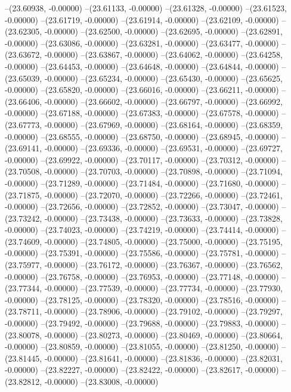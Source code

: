 --(23.60938, -0.00000)
--(23.61133, -0.00000)
--(23.61328, -0.00000)
--(23.61523, -0.00000)
--(23.61719, -0.00000)
--(23.61914, -0.00000)
--(23.62109, -0.00000)
--(23.62305, -0.00000)
--(23.62500, -0.00000)
--(23.62695, -0.00000)
--(23.62891, -0.00000)
--(23.63086, -0.00000)
--(23.63281, -0.00000)
--(23.63477, -0.00000)
--(23.63672, -0.00000)
--(23.63867, -0.00000)
--(23.64062, -0.00000)
--(23.64258, -0.00000)
--(23.64453, -0.00000)
--(23.64648, -0.00000)
--(23.64844, -0.00000)
--(23.65039, -0.00000)
--(23.65234, -0.00000)
--(23.65430, -0.00000)
--(23.65625, -0.00000)
--(23.65820, -0.00000)
--(23.66016, -0.00000)
--(23.66211, -0.00000)
--(23.66406, -0.00000)
--(23.66602, -0.00000)
--(23.66797, -0.00000)
--(23.66992, -0.00000)
--(23.67188, -0.00000)
--(23.67383, -0.00000)
--(23.67578, -0.00000)
--(23.67773, -0.00000)
--(23.67969, -0.00000)
--(23.68164, -0.00000)
--(23.68359, -0.00000)
--(23.68555, -0.00000)
--(23.68750, -0.00000)
--(23.68945, -0.00000)
--(23.69141, -0.00000)
--(23.69336, -0.00000)
--(23.69531, -0.00000)
--(23.69727, -0.00000)
--(23.69922, -0.00000)
--(23.70117, -0.00000)
--(23.70312, -0.00000)
--(23.70508, -0.00000)
--(23.70703, -0.00000)
--(23.70898, -0.00000)
--(23.71094, -0.00000)
--(23.71289, -0.00000)
--(23.71484, -0.00000)
--(23.71680, -0.00000)
--(23.71875, -0.00000)
--(23.72070, -0.00000)
--(23.72266, -0.00000)
--(23.72461, -0.00000)
--(23.72656, -0.00000)
--(23.72852, -0.00000)
--(23.73047, -0.00000)
--(23.73242, -0.00000)
--(23.73438, -0.00000)
--(23.73633, -0.00000)
--(23.73828, -0.00000)
--(23.74023, -0.00000)
--(23.74219, -0.00000)
--(23.74414, -0.00000)
--(23.74609, -0.00000)
--(23.74805, -0.00000)
--(23.75000, -0.00000)
--(23.75195, -0.00000)
--(23.75391, -0.00000)
--(23.75586, -0.00000)
--(23.75781, -0.00000)
--(23.75977, -0.00000)
--(23.76172, -0.00000)
--(23.76367, -0.00000)
--(23.76562, -0.00000)
--(23.76758, -0.00000)
--(23.76953, -0.00000)
--(23.77148, -0.00000)
--(23.77344, -0.00000)
--(23.77539, -0.00000)
--(23.77734, -0.00000)
--(23.77930, -0.00000)
--(23.78125, -0.00000)
--(23.78320, -0.00000)
--(23.78516, -0.00000)
--(23.78711, -0.00000)
--(23.78906, -0.00000)
--(23.79102, -0.00000)
--(23.79297, -0.00000)
--(23.79492, -0.00000)
--(23.79688, -0.00000)
--(23.79883, -0.00000)
--(23.80078, -0.00000)
--(23.80273, -0.00000)
--(23.80469, -0.00000)
--(23.80664, -0.00000)
--(23.80859, -0.00000)
--(23.81055, -0.00000)
--(23.81250, -0.00000)
--(23.81445, -0.00000)
--(23.81641, -0.00000)
--(23.81836, -0.00000)
--(23.82031, -0.00000)
--(23.82227, -0.00000)
--(23.82422, -0.00000)
--(23.82617, -0.00000)
--(23.82812, -0.00000)
--(23.83008, -0.00000)
